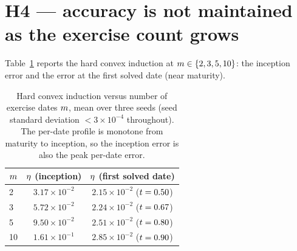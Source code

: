 \documentclass[11pt]{article}
\theoremstyle{plain}
\theoremstyle{definition}
\theoremstyle{remark}
\begin{document}
\section{H4 --- accuracy is not maintained as the exercise count grows}\label{sec:h4}

Table~\ref{tab:mscaling} reports the hard convex induction at
$m\in\{2,3,5,10\}$: the inception error and the error at the
first solved date (near maturity).

\begin{table}[htbp]\centering
\caption{Hard convex induction versus number of exercise dates
  $m$, mean over three seeds (seed standard deviation
  $<3\times10^{-4}$ throughout). The per-date profile is monotone from maturity
  to inception, so the inception error is also the peak per-date error.}\label{tab:mscaling}
\begin{tabular}{lcc}
\toprule
$m$ & $\eta$ (inception) & $\eta$ (first solved date)\\
\midrule
2  & $3.17\times10^{-2}$ & $2.15\times10^{-2}$ ($t=0.50$)\\
3  & $5.72\times10^{-2}$ & $2.24\times10^{-2}$ ($t=0.67$)\\
5  & $9.50\times10^{-2}$ & $2.51\times10^{-2}$ ($t=0.80$)\\
10 & $1.61\times10^{-1}$ & $2.85\times10^{-2}$ ($t=0.90$)\\
\bottomrule
\end{tabular}
\end{table}
\end{document}
